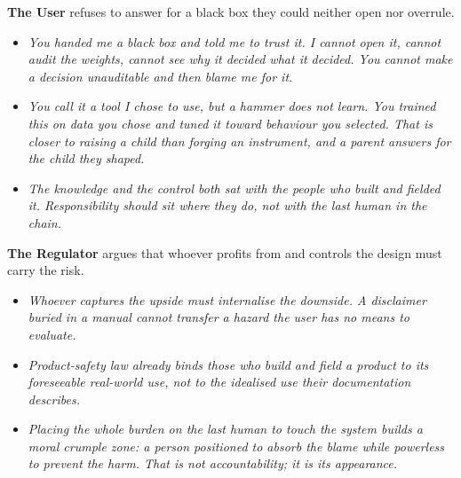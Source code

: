 \medskip
\noindent\textbf{The User} refuses to answer for a black box they could
    neither open nor overrule.
    \begin{itemize}
        \item \textit{You handed me a black box and told me to trust it. I
        cannot open it, cannot audit the weights, cannot see why it decided
        what it decided. You cannot make a decision unauditable and then
        blame me for it.}
        \item \textit{You call it a tool I chose to use, but a hammer does
        not learn. You trained this on data you chose and tuned it toward
        behaviour you selected. That is closer to raising a child than
        forging an instrument, and a parent answers for the child they
        shaped.}
        \item \textit{The knowledge and the control both sat with the people
        who built and fielded it. Responsibility should sit where they do,
        not with the last human in the chain.}
    \end{itemize}

\medskip
\noindent\textbf{The Regulator} argues that whoever profits from and
    controls the design must carry the risk.
    \begin{itemize}
        \item \textit{Whoever captures the upside must internalise the
        downside. A disclaimer buried in a manual cannot transfer a hazard
        the user has no means to evaluate.}
        \item \textit{Product-safety law already binds those who build and
        field a product to its foreseeable real-world use, not to the
        idealised use their documentation describes.}
        \item \textit{Placing the whole burden on the last human to touch
        the system builds a moral crumple zone\cite{elish2019crumple}: a
        person positioned to absorb the blame while powerless to prevent the
        harm. That is not accountability; it is its appearance.}
    \end{itemize}


